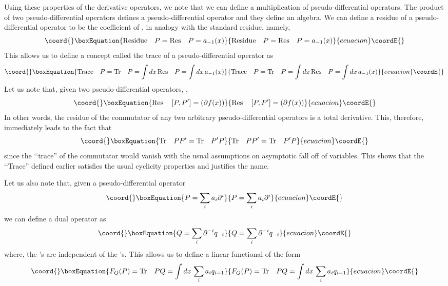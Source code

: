 \documentclass[a4paper,11pt]{article}
\begin{document}
Using these properties of the derivative operators, we note that we
can define a multiplication of pseudo-differential operators. The
product of two pseudo-differential operators defines a
pseudo-differential operator and
 they define an algebra. We can define a residue of a
pseudo-differential operator to be the coefficient of \coordHE{},
in analogy with the standard residue, namely,
\begin{equation}\coord{}\boxEquation{
{\rm Residue}\quad P = {\rm Res}\quad P = a_{-1} (x)
}{
{\rm Residue}\quad P = {\rm Res}\quad P = a_{-1} (x)
}{ecuacion}\coordE{}\end{equation}
This allows us to define a concept called the trace of a
pseudo-differential operator as
\begin{equation}\coord{}\boxEquation{
{\rm Trace}\quad P = {\rm Tr}\quad P = \int dx\,{\rm Res}\quad P =
\int dx\, a_{-1}(x)
}{
{\rm Trace}\quad P = {\rm Tr}\quad P = \int dx\,{\rm Res}\quad P =
\int dx\, a_{-1}(x)
}{ecuacion}\coordE{}\end{equation}
Let us note that, given two pseudo-differential operators, \coordHE{},
\begin{equation}\coord{}\boxEquation{
{\rm Res}\quad \left[P , P'\right] = \left(\partial f(x)\right)
}{
{\rm Res}\quad \left[P , P'\right] = \left(\partial f(x)\right)
}{ecuacion}\coordE{}\end{equation}
In other words, the residue of the commutator of any two arbitrary
pseudo-differential operators is a total derivative. This, therefore,
immediately leads to the fact that
\begin{equation}\coord{}\boxEquation{
{\rm Tr}\quad PP' = {\rm Tr}\quad P'P
}{
{\rm Tr}\quad PP' = {\rm Tr}\quad P'P
}{ecuacion}\coordE{}\end{equation}
since the \lq\lq trace'' of the commutator would vanish with the usual
assumptions on asymptotic fall off of variables. This shows that the
\lq\lq Trace'' defined earlier satisfies the usual cyclicity
properties and justifies the name.

Let us also note that, given a pseudo-differential operator
\begin{equation}\coord{}\boxEquation{
P = \sum_{i} a_{i} \partial^{i}
}{
P = \sum_{i} a_{i} \partial^{i}
}{ecuacion}\coordE{}\end{equation}
we can define a dual operator as
\begin{equation}\coord{}\boxEquation{
Q = \sum_{i} \partial^{-i} q_{-i}
}{
Q = \sum_{i} \partial^{-i} q_{-i}
}{ecuacion}\coordE{}\end{equation}
where, the \coordHE{}'s are independent of the \coordHE{}'s. This allows us
to define a linear functional of the form
\begin{equation}\coord{}\boxEquation{
F_{Q} (P) = {\rm Tr}\quad PQ = \int dx\,\sum_{i} a_{i} q_{i-1}
}{
F_{Q} (P) = {\rm Tr}\quad PQ = \int dx\,\sum_{i} a_{i} q_{i-1}
}{ecuacion}\coordE{}\end{equation}
\end{document}
